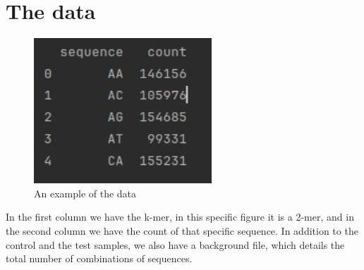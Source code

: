 \chapter{The data}
\begin{figure}[H]
	\centering
	\includegraphics[width=0.7\linewidth]{../figures/data_example.png}
	\caption{An example of the data}
	\label{fig:data0}
\end{figure}

In the first column we have the k-mer, in this specific figure it is a 2-mer, and in the second column we have the count of that specific sequence. In addition to the control and the test samples, we also have a background file, which details the total number of combinations of sequences.
